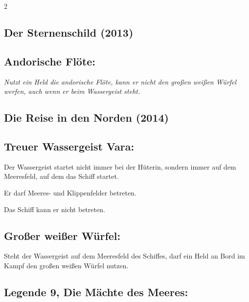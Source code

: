 \documentclass[10pt, a4paper, oneside]{book}
\newcommand{\fan}[1]{\textit{#1}}
\begin{document}
\begin{multicols*}{2}
\begin{nobgcolor}
\end{nobgcolor}

\columnbreak

\begin{bgcolor}
\section{Der Sternenschild (2013)}

\subsection{Andorische Flöte:}

\fan{Nutzt ein Held die andorische Flöte, kann er nicht den großen weißen Würfel werfen, auch wenn er beim Wassergeist steht.}

\end{bgcolor}



\begin{bgcolor}
\section{Die Reise in den Norden (2014)}



\subsection{Treuer Wassergeist Vara:}

Der Wassergeist startet nicht immer bei der Hüterin, sondern immer auf dem Meeresfeld, auf dem das Schiff startet. 
\supercite{dridn-begleitheft}

Er darf Meeres- und Klippenfelder betreten.
\supercite{10815,dridn-begleitheft,dridn-faq} 

Das Schiff kann er nicht betreten.
\supercite{dridn-begleitheft}



\subsection{Großer weißer Würfel:}

Steht der Wassergeist auf dem Meeresfeld des Schiffes, darf ein Held an Bord im Kampf den großen weißen Würfel nutzen.
\supercite{dridn-begleitheft}


\subsection{Legende 9, Die Mächte des Meeres:}


\end{bgcolor}
\end{multicols*}
\end{document}
